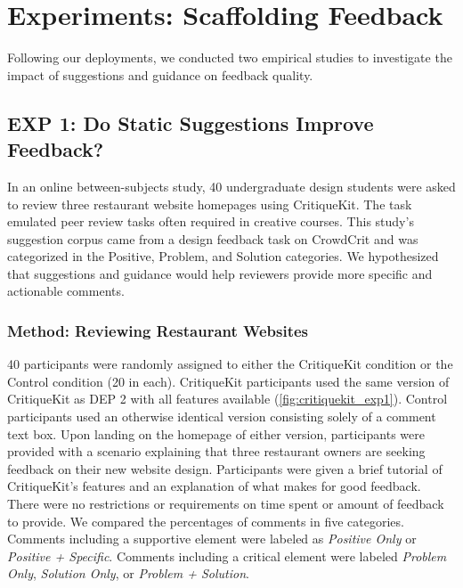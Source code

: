 \section{Experiments: Scaffolding Feedback}
Following our deployments, we conducted two empirical studies to investigate the impact of suggestions and guidance on feedback quality.

\subsection{EXP 1: Do Static Suggestions Improve Feedback?}
In an online between-subjects study, 40 undergraduate design students were asked to review three restaurant website homepages using CritiqueKit. The task emulated peer review tasks often required in creative courses. This study's suggestion corpus came from a design feedback task on CrowdCrit \cite{Luther2015} and was categorized in the Positive, Problem, and Solution categories. We hypothesized that suggestions and guidance would help reviewers provide more specific and actionable comments.

\subsubsection{Method: Reviewing Restaurant Websites}
40 participants were randomly assigned to either the CritiqueKit condition or the Control condition (20 in each). CritiqueKit participants used the same version of CritiqueKit as DEP 2 with all features available (\autoref{fig:critiquekit_exp1}). Control participants used an otherwise identical version consisting solely of a comment text box. Upon landing on the homepage of either version, participants were provided with a scenario explaining that three restaurant owners are seeking feedback on their new website design. Participants were given a brief tutorial of CritiqueKit's features and an explanation of what makes for good feedback. There were no restrictions or requirements on time spent or amount of feedback to provide. We compared the percentages of comments in five categories. Comments including a supportive element were labeled as \textit{Positive Only} or \textit{Positive + Specific}. Comments including a critical element were labeled \textit{Problem Only}, \textit{Solution Only}, or \textit{Problem + Solution}.

